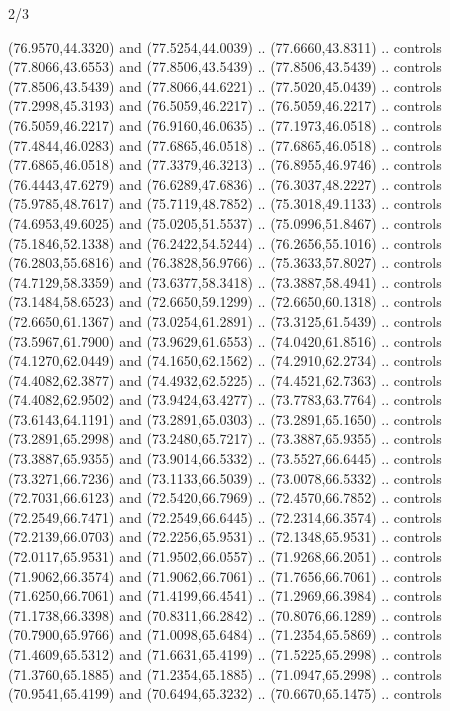 \begin{flagdescription}{2/3}
\begin{scope}[xshift=0.3333\flaglength,yshift=0.5\flagwidth,scale=\flagwidth/711.3]
\begin{scope}
    (76.9570,44.3320) and (77.5254,44.0039) .. (77.6660,43.8311) .. controls
    (77.8066,43.6553) and (77.8506,43.5439) .. (77.8506,43.5439) .. controls
    (77.8506,43.5439) and (77.8066,44.6221) .. (77.5020,45.0439) .. controls
    (77.2998,45.3193) and (76.5059,46.2217) .. (76.5059,46.2217) .. controls
    (76.5059,46.2217) and (76.9160,46.0635) .. (77.1973,46.0518) .. controls
    (77.4844,46.0283) and (77.6865,46.0518) .. (77.6865,46.0518) .. controls
    (77.6865,46.0518) and (77.3379,46.3213) .. (76.8955,46.9746) .. controls
    (76.4443,47.6279) and (76.6289,47.6836) .. (76.3037,48.2227) .. controls
    (75.9785,48.7617) and (75.7119,48.7852) .. (75.3018,49.1133) .. controls
    (74.6953,49.6025) and (75.0205,51.5537) .. (75.0996,51.8467) .. controls
    (75.1846,52.1338) and (76.2422,54.5244) .. (76.2656,55.1016) .. controls
    (76.2803,55.6816) and (76.3828,56.9766) .. (75.3633,57.8027) .. controls
    (74.7129,58.3359) and (73.6377,58.3418) .. (73.3887,58.4941) .. controls
    (73.1484,58.6523) and (72.6650,59.1299) .. (72.6650,60.1318) .. controls
    (72.6650,61.1367) and (73.0254,61.2891) .. (73.3125,61.5439) .. controls
    (73.5967,61.7900) and (73.9629,61.6553) .. (74.0420,61.8516) .. controls
    (74.1270,62.0449) and (74.1650,62.1562) .. (74.2910,62.2734) .. controls
    (74.4082,62.3877) and (74.4932,62.5225) .. (74.4521,62.7363) .. controls
    (74.4082,62.9502) and (73.9424,63.4277) .. (73.7783,63.7764) .. controls
    (73.6143,64.1191) and (73.2891,65.0303) .. (73.2891,65.1650) .. controls
    (73.2891,65.2998) and (73.2480,65.7217) .. (73.3887,65.9355) .. controls
    (73.3887,65.9355) and (73.9014,66.5332) .. (73.5527,66.6445) .. controls
    (73.3271,66.7236) and (73.1133,66.5039) .. (73.0078,66.5332) .. controls
    (72.7031,66.6123) and (72.5420,66.7969) .. (72.4570,66.7852) .. controls
    (72.2549,66.7471) and (72.2549,66.6445) .. (72.2314,66.3574) .. controls
    (72.2139,66.0703) and (72.2256,65.9531) .. (72.1348,65.9531) .. controls
    (72.0117,65.9531) and (71.9502,66.0557) .. (71.9268,66.2051) .. controls
    (71.9062,66.3574) and (71.9062,66.7061) .. (71.7656,66.7061) .. controls
    (71.6250,66.7061) and (71.4199,66.4541) .. (71.2969,66.3984) .. controls
    (71.1738,66.3398) and (70.8311,66.2842) .. (70.8076,66.1289) .. controls
    (70.7900,65.9766) and (71.0098,65.6484) .. (71.2354,65.5869) .. controls
    (71.4609,65.5312) and (71.6631,65.4199) .. (71.5225,65.2998) .. controls
    (71.3760,65.1885) and (71.2354,65.1885) .. (71.0947,65.2998) .. controls
    (70.9541,65.4199) and (70.6494,65.3232) .. (70.6670,65.1475) .. controls

\end{scope}
\end{scope}
\end{flagdescription}
